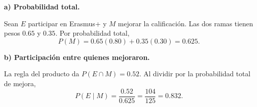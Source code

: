 \textbf{a) Probabilidad total.}\par\nopagebreak[4]
Sean $E$ participar en Erasmus+ y $M$ mejorar la calificación. Las dos ramas tienen pesos $0.65$ y $0.35$. Por probabilidad total,
\[
\boxed{P(M)=0.65(0.80)+0.35(0.30)=0.625.}
\]

\textbf{b) Participación entre quienes mejoraron.}\par\nopagebreak[4]
La regla del producto da $P(E\cap M)=0.52$. Al dividir por la probabilidad total de mejora,
\[
\boxed{P(E\mid M)=\frac{0.52}{0.625}=\frac{104}{125}=0.832.}
\]
